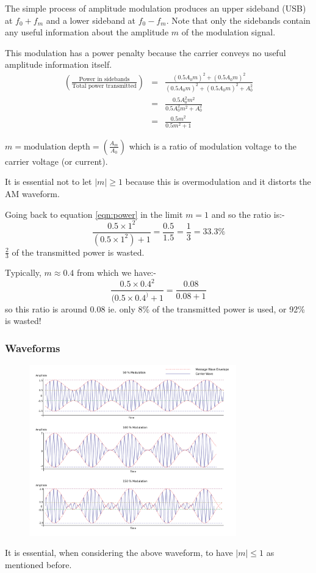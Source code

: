 \documentclass[11pt]{article} %
\begin{document}
		The simple process of amplitude modulation produces an upper sideband (USB) at $f_0+f_m$ and a lower sideband at $f_0-f_m$. Note that only the sidebands contain any useful information about the amplitude $m$ of the modulation signal.

		This modulation has a power penalty because the carrier conveys no useful amplitude information itself.
		\begin{eqnarray}
			\left(\frac{\mbox{Power in sidebands}}{\mbox{Total power transmitted}}\right) &=& \frac{(0.5A_0m)^2+(0.5A_0m)^2}{(0.5A_0m)^2+(0.5A_0m)^2+A_0^2} \nonumber \\
			&=& \frac{0.5A_0^2m^2}{0.5A_0^2m^2 + A_0^2} \nonumber \\
			&=& \frac{0.5m^2}{0.5m^2+1}
			\label{eqn:power}
		\end{eqnarray}

		$m = \mbox{modulation depth} = \left(\frac{A_m}{A_0}\right)$ which is a ratio of modulation voltage to the carrier voltage (or current).

		It is essential not to let $|m|\ge 1$ because this is overmodulation and it distorts the AM waveform.

		Going back to equation \ref{eqn:power}  in the limit $m=1$ and so the ratio is:-
		\begin{equation}
			\frac{0.5\times 1^2}{(0.5\times 1^2)+1} = \frac{0.5}{1.5} = \frac{1}{3} = 33.3\%
		\end{equation}
		$\frac{2}{3}$ of the transmitted power is wasted.

		Typically, $m\approx 0.4$ from which we have:-
		\begin{equation}
			\frac{0.5\times 0.4^2}{(0.5\times 0.4^)+1} = \frac{0.08}{0.08+1}
		\end{equation}
		so this ratio is around 0.08 ie. only 8\% of the transmitted power is used, or 92\% is wasted!

	\subsubsection{Waveforms}
		\begin{figure}[h]
			\centering
			\includegraphics[width=0.8\textwidth]{modulatedwave}
		\end{figure}
		It is essential, when considering the above waveform, to have $|m|\le 1$ as mentioned before.
\end{document}
